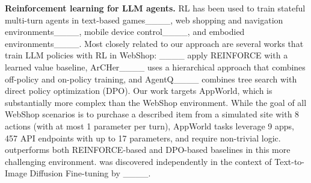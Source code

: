 \textbf{Reinforcement learning for LLM agents.}
RL has been used to train stateful multi-turn agents in text-based games____, web shopping and navigation  environments____, mobile device control____, and embodied environments____.
Most closely related to our approach are several works that train LLM policies with RL in WebShop:
____ apply REINFORCE with a learned value baseline,
ArCHer____ uses a hierarchical approach that combines off-policy and on-policy training, and
AgentQ____ combines tree search with direct policy optimization (DPO).
Our work targets AppWorld, which is substantially more complex than the WebShop environment.
While the goal of all WebShop scenarios is to purchase a described item from a simulated site with 8 actions (with at most 1 parameter per turn), AppWorld tasks leverage 9 apps, 457 API endpoints with up to 17 parameters, and require non-trivial logic.
\ours outperforms both REINFORCE-based and DPO-based baselines in this more challenging environment.
\ours was discovered independently in the context of Text-to-Image Diffusion Fine-tuning by ____.
%
%
%


%
%
%
%
%
%

%
%


%

%
%
%
%
%
%
%
%

%

%
%

%
%
%
%
%
%

%

%
%
%
%
%
%
%
%
%

%
%

%
%
%
%
%
%
%
%
%

%
%
%
%

%
%
%
%
%

%
%


%
%
%
%

%


%
%
%
%
%

%
%
%
%
%
%

%

%
%
%
%
%
%
%
%
%

%
%
%
%
%
%
%
%
%

%
%
%
%
%
%
%

%

%
%
%

%
%
%

%
%

%
%

%



%
%

%
%

%
%
%
%
%

%
%

%
%

%

%
%

%
%
%
%
%
%